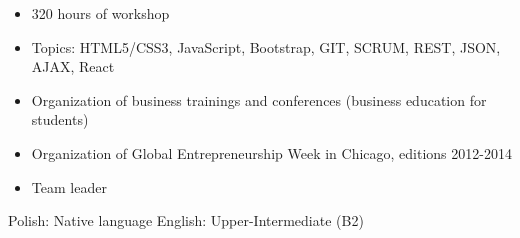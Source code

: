 \documentclass{my_cv}
\begin{document}
\begin{adjustwidth}{2em}{0em}

\begin{itemize}
    \item 320 hours of workshop
    \item Topics: HTML5/CSS3, JavaScript, Bootstrap, GIT, SCRUM, REST, JSON, AJAX, React
\end{itemize}


\end{adjustwidth}
\vspace{1em}

\begin{multicols}{2}
    \begin{itemize}
        \item Organization of business trainings and conferences (business education for students)
        \item Organization of Global Entrepreneurship Week in Chicago, editions 2012-2014
        \item Team leader
    \end{itemize}
    \columnbreak
    \begin{adjustwidth}{1em}{0em}
    Polish: Native language
    \newline
    English: Upper-Intermediate (B2)
    \end{adjustwidth}
\end{multicols}
\end{document}
